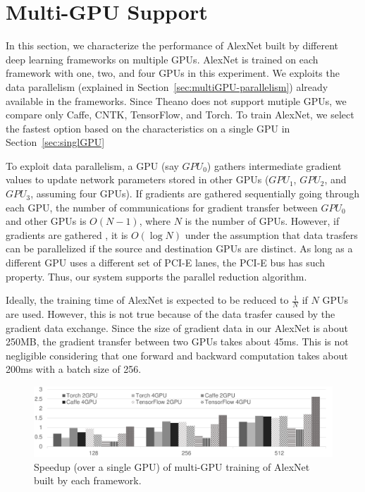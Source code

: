 \section{Multi-GPU Support}
\label{multi-GPU}
In this section, we characterize the performance of AlexNet built by different deep learning frameworks on multiple GPUs. AlexNet is trained on each framework with one, two, and four GPUs in this experiment. We exploits the data parallelism (explained in Section~\ref{sec:multiGPU-parallelism}) already available in the frameworks. Since Theano does not support mutiple GPUs, we compare only Caffe, CNTK, TensorFlow, and Torch. To train AlexNet, we select the fastest option based on the characteristics on a single GPU in Section~\ref{sec:singlGPU}

To exploit data parallelism, a GPU (say $GPU_0$) gathers intermediate gradient values to update network parameters stored in other GPUs ($GPU_1$, $GPU_2$, and $GPU_3$, assuming four GPUs). If gradients are gathered sequentially going through each GPU, the number of communications for gradient transfer between $GPU_0$ and other GPUs is $O(N-1)$, where $N$ is the number of GPUs. However, if gradients are gathered \cite{harris2007optimizing}, it is $O(\log{N})$ under the assumption that data trasfers can be parallelized if the source and destination GPUs are distinct. As long as a different GPU uses a different set of PCI-E lanes, the PCI-E bus has such property. Thus, our system supports the parallel reduction algorithm.

Ideally, the training time of AlexNet is expected to be reduced to $\frac{1}{N}$ if $N$ GPUs are used. However, this is not true because of the data trasfer caused by the gradient data exchange.
Since the size of gradient data in our AlexNet is about 250MB, the gradient transfer between two GPUs takes about 45ms. This is not negligible considering that one forward and backward computation takes  about 200ms with a batch size of 256.

\begin{figure}[htbp]
  \centering
  \includegraphics[width=.9\linewidth]{./figures/MG}
\caption{Speedup (over a single GPU) of multi-GPU training of AlexNet built by each framework.}
\label{fig_mg}
\end{figure}

